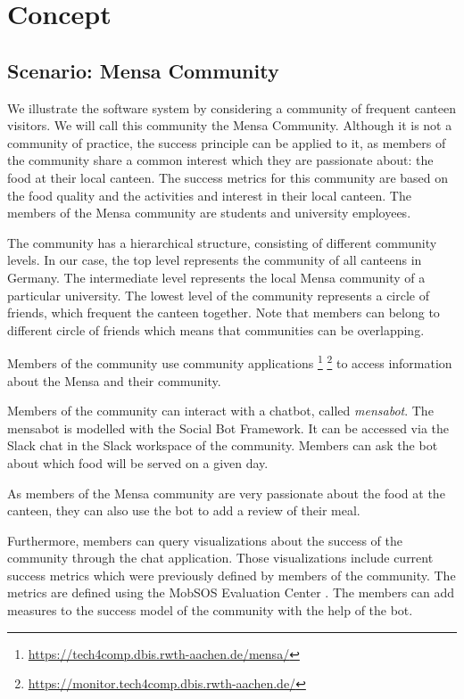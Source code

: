 \chapter{Concept}\label{cha:concept}
\section{Scenario: Mensa Community}
We illustrate the software system by considering a community of frequent canteen visitors. We will call this community the Mensa Community.
Although it is not a community of practice, the success principle can be applied to it, as members of the community share a common interest which they are passionate about: the food at their local canteen.
The success metrics for this community are based on the food quality and the activities and interest in their local canteen.
The members of the Mensa community are students and university employees.

The community has a hierarchical structure, consisting of different community levels.
In our case, the top level represents the community of all canteens in Germany.
The intermediate level represents the local Mensa community of a particular university.
The lowest level of the community represents a circle of friends, which frequent the canteen together. Note that members can belong to different circle of friends which means that communities can be overlapping.

Members of the community use community applications \footnote{\url{https://tech4comp.dbis.rwth-aachen.de/mensa/}}
\footnote{\url{https://monitor.tech4comp.dbis.rwth-aachen.de/}} to access information about the Mensa and their community.

Members of the community can interact with a chatbot, called \emph{mensabot}. The mensabot is modelled with  the Social Bot Framework. It can be accessed via the Slack chat in the Slack workspace of the community. Members can ask the bot about which food will be served on a given day.

As members of the Mensa community are very passionate about the food at the canteen, they can also use the bot to add a review of their meal.

Furthermore, members can query visualizations about the success of the community through the chat application. Those visualizations include current success metrics which were previously defined by members of the community. The metrics are defined using the MobSOS Evaluation Center \cite{Hoss19}. The members can add measures to the success model of the community with the help of the bot.

